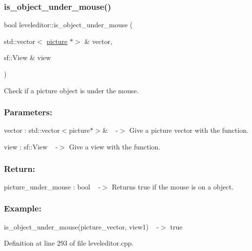 \subsubsection{\texorpdfstring{is\+\_\+object\+\_\+under\+\_\+mouse()}{is\_object\_under\_mouse()}\hspace{0.1cm}{\footnotesize\ttfamily [1/2]}}
{\footnotesize\ttfamily bool leveleditor\+::is\+\_\+object\+\_\+under\+\_\+mouse (\begin{DoxyParamCaption}\item[{std\+::vector$<$ \hyperlink{classpicture}{picture} $\ast$$>$ \&}]{vector,  }\item[{sf\+::\+View \&}]{view }\end{DoxyParamCaption})\hspace{0.3cm}{\ttfamily [private]}}



Check if a picture object is under the mouse. 

\subsubsection*{Parameters\+: }

vector \+: std\+::vector$<$picture$\ast$$>$\& ~\newline
-\/$>$ Give a picture vector with the function.

view \+: sf\+::\+View ~\newline
-\/$>$ Give a view with the function.

\subsubsection*{Return\+: }

picture\+\_\+under\+\_\+mouse \+: bool ~\newline
-\/$>$ Returns true if the mouse is on a object. ~\newline
 \subsubsection*{Example\+: }

is\+\_\+object\+\_\+under\+\_\+mouse(picture\+\_\+vector, view1) ~\newline
-\/$>$ true 

Definition at line 293 of file leveleditor.\+cpp.

